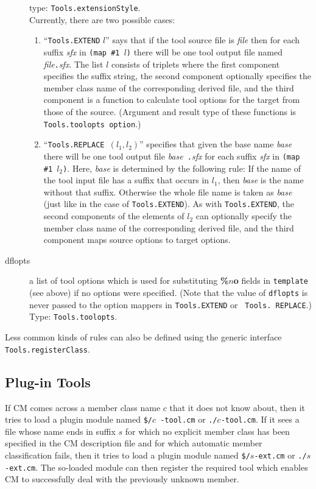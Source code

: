 \documentclass[titlepage,letterpaper]{article}
\begin{document}
\begin{description}
type: {\tt Tools.extensionStyle}. \\
Currently, there are two possible cases:
\begin{enumerate}
\item ``{\tt Tools.EXTEND} $l$'' says that if the tool source file is
{\it file} then for each suffix {\it sfx} in {\tt (map \#1 $l$)} there
will be one tool output file named {\it file}{\tt .}{\it sfx}.  The
list $l$ consists of triplets where the first component specifies the
suffix string, the second component optionally specifies the
member class name of the corresponding derived file, and the
third component is a function to calculate tool options for the 
target from those of the source. (Argument and result type of these
functions is {\tt Tools.toolopts option}.)
\item ``{\tt Tools.REPLACE }$(l_1, l_2)$'' specifies that given the
base name {\it base} there will be one tool output file {\it base}{\tt
.}{\it sfx} for each suffix {\it sfx} in {\tt (map \#1 $l_2$)}.  Here,
{\it base} is determined by the following rule: If the name of the
tool input file has a suffix that occurs in $l_1$, then {\it base} is
the name without that suffix.  Otherwise the whole file name is taken
as {\it base} (just like in the case of {\tt Tools.EXTEND}).  As with
{\tt Tools.EXTEND}, the second components of the elements of $l_2$ can
optionally specify the member class name of the corresponding derived
file, and the third component maps source options to target options.
\end{enumerate}
\item[dflopts] a list of tool options which is used for
substituting {\bf \%$n$o} fields in {\tt template} (see above) if no
options were specified.  (Note that the value of {\tt dflopts} is never
passed to the option mappers in {\tt Tools.EXTEND} or {\tt
Tools. REPLACE}.)  Type: {\tt Tools.toolopts}.
\end{description}

Less common kinds of rules can also be defined using the generic
interface {\tt Tools.registerClass}.

\subsection{Plug-in Tools}

If CM comes across a member class name $c$ that it does not know
about, then it tries to load a plugin module named {\tt \$/}$c${\tt
-tool.cm} or {\tt ./}$c${\tt -tool.cm}.  If it sees a file whose name
ends in suffix $s$ for which no explicit member class has been
specified in the CM description file and for which automatic
member classification fails, then it tries to load a plugin module
named {\tt \$/}$s${\tt -ext.cm} or {\tt ./}$s${\tt -ext.cm}.  The
so-loaded module can then register the required tool which enables CM
to successfully deal with the previously unknown member.
\end{document}
